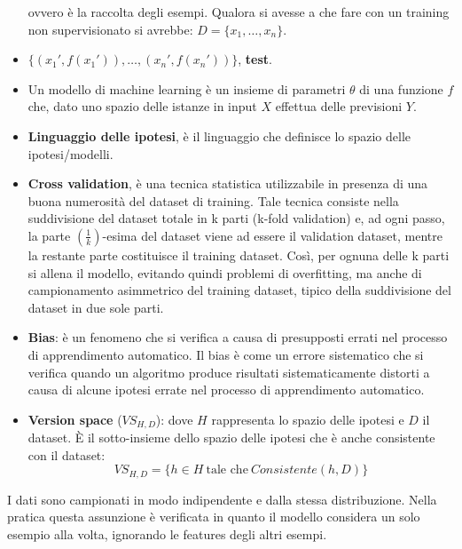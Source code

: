 \begin{itemize}
          ovvero è la raccolta degli esempi. Qualora si avesse a che fare con un training
          non supervisionato si avrebbe: $D = \{x_1, \dots, x_n\}$.
    \item $\{(x_1', f(x_1')), \dots, (x_n', f(x_n'))\}$, \textbf{test}.
    \item Un modello di machine learning è un insieme di parametri $\theta$ di una
          funzione $f$ che, dato uno spazio delle istanze in input $X$ effettua delle
          previsioni $Y$.
    \item \textbf{Linguaggio delle ipotesi}, è il linguaggio che definisce lo
          spazio delle ipotesi/modelli.
    \item \textbf{Cross validation}, è una tecnica statistica utilizzabile in
          presenza di una buona numerosità del dataset di training. Tale tecnica
          consiste nella suddivisione del dataset totale in k parti (k-fold
          validation) e, ad ogni passo, la parte $ \left(\frac{1}{k}\right)$-esima
          del dataset viene ad essere il validation dataset, mentre la restante
          parte costituisce il training dataset. Così, per ognuna delle k parti
          si allena il modello, evitando quindi problemi di overfitting, ma anche
          di campionamento asimmetrico del training dataset, tipico della
          suddivisione del dataset in due sole parti.
    \item \textbf{Bias}: è un fenomeno che si verifica a causa di presupposti
          errati nel processo di apprendimento automatico. Il bias è come un
          errore sistematico che si verifica quando un algoritmo produce risultati
          sistematicamente distorti a causa di alcune ipotesi errate nel processo
          di apprendimento automatico.
    \item \textbf{Version space} ($VS_{H, D}$): dove $H$ rappresenta lo spazio
          delle ipotesi e $D$ il dataset. È il sotto-insieme dello spazio delle ipotesi
          che è anche consistente con il dataset:
          \begin{equation}
              VS_{H, D} = \{h \in H \ \text{tale che} \ Consistente(h, D)\}
          \end{equation}
\end{itemize}
\begin{definizione} 
    I dati sono campionati in modo indipendente e dalla stessa distribuzione.
    Nella pratica questa assunzione è verificata in quanto il modello considera
    un solo esempio alla volta, ignorando le features degli altri esempi.
\end{definizione}
